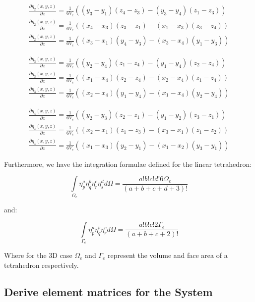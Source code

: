 \documentclass[12pt]{article}
\begin{document}
\begin{align*}
\frac{\partial \eta_2(x,y,z)}{\partial x} = \frac{1}{6V_e}((y_3-y_1)(z_4-z_3)-(y_3-y_4)(z_1-z_3)) \\
\frac{\partial \eta_2(x,y,z)}{\partial x} = \frac{1}{6V_e}((x_4-x_3)(z_3-z_1)-(x_1-x_3)(z_3-z_4)) \\
\frac{\partial \eta_2(x,y,z)}{\partial x} = \frac{1}{6V_e}((x_3-x_1)(y_4-y_3)-(x_3-x_4)(y_1-y_3))
\end{align*}

\begin{align*}
\frac{\partial \eta_3(x,y,z)}{\partial x} = \frac{1}{6V_e}((y_2-y_4)(z_1-z_4)-(y_1-y_4)(z_2-z_4)) \\
\frac{\partial \eta_3(x,y,z)}{\partial x} = \frac{1}{6V_e}((x_1-x_4)(z_2-z_4)-(x_2-x_4)(z_1-z_4)) \\
\frac{\partial \eta_3(x,y,z)}{\partial x} = \frac{1}{6V_e}((x_2-x_4)(y_1-y_4)-(x_1-x_4)(y_2-y_4))
\end{align*}

\begin{align*}
\frac{\partial \eta_4(x,y,z)}{\partial x} = \frac{1}{6V_e}((y_2-y_3)(z_2-z_1)-(y_1-y_2)(z_3-z_1)) \\
\frac{\partial \eta_4(x,y,z)}{\partial x} = \frac{1}{6V_e}((x_2-x_1)(z_1-z_3)-(x_3-x_1)(z_1-z_2)) \\
\frac{\partial \eta_4(x,y,z)}{\partial x} = \frac{1}{6V_e}((x_1-x_3)(y_2-y_1)-(x_1-x_2)(y_3-y_1))
\end{align*}

Furthermore, we have the integration formulae defined for the linear tetrahedron:

\begin{equation}
 \int\limits_{\Omega_e} \eta_p^a \eta_q^b \eta_r^c \eta_s^d d{\Omega}=
 \frac{a!b!c!d!6\Omega_e}{(a+b+c+d+3)!}
\end{equation}

and:

\begin{equation}
 \int\limits_{\Gamma_e} \eta_p^a \eta_q^b \eta_r^c  d{\Omega}=
 \frac{a!b!c!2\Gamma_e}{(a+b+c+2)!}
\end{equation}

Where for the 3D case $\Omega_e$ and $\Gamma_e$ represent the volume and face area of a tetrahedron respectively.

\subsection{Derive element matrices for the System}
\end{document}
